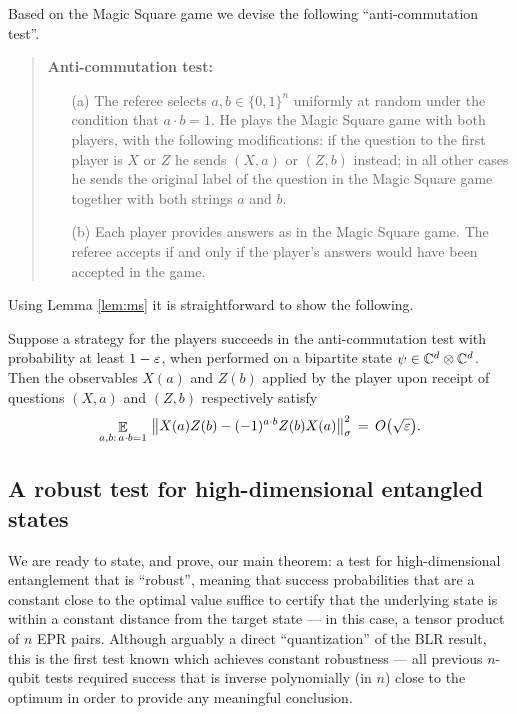 Based on the Magic Square game we devise the following ``anti-commutation test''. 

\begin{quote}
\textbf{Anti-commutation test:}
\begin{itemize}
\item[(a)] The referee selects $a,b\in\{0,1\}^n$ uniformly at random under the condition that $a\cdot b=1$. He plays the Magic Square game with both players, with the following modifications: if the question to the first player is $X$ or $Z$ he sends $(X,a)$ or $(Z,b)$ instead; in all other cases he sends the original label of the question in the Magic Square game together with both strings $a$ and $b$. 
\item[(b)] Each player provides answers as in the Magic Square game. The referee accepts if and only if the player's answers would have been accepted in the game. 
\end{itemize}
\end{quote}

Using Lemma \ref{lem:ms} it is straightforward to show the following. 

\begin{lemma}\label{lem:ac}
Suppose a strategy for the players succeeds in the anti-commutation test with probability at least $1-\varepsilon$, when performed on a bipartite state $\psi \in \mathbb{C}^d \otimes \mathbb{C}^d$. Then the observables $X(a)$ and $Z(b)$ applied by the player upon receipt of questions $(X,a)$ and $(Z,b)$ respectively satisfy 
\begin{equation}\label{eq:ac}
 \mathop{\mathbb{E}}\displaylimits_{a,b:\,a\cdot b=1} \,\big\| X(a)Z(b)-(-1)^{a\cdot b} Z(b)X(a)\big\|_\sigma^2\,=\,O\big(\sqrt{\varepsilon}\big).
\end{equation}
\end{lemma}

\subsection{A robust test for high-dimensional entangled states}
\label{subsection-robust-test-high-dim-entangled-states}

We are ready to state, and prove, our main theorem: a test for high-dimensional entanglement that is ``robust'', meaning that success probabilities that are a constant close to the optimal value suffice to certify that the underlying state is within a constant distance from the target state --- in this case, a tensor product of $n$ EPR pairs. Although arguably a direct ``quantization'' of the BLR result, this is the first test known which achieves constant robustness --- all previous $n$-qubit tests required success that is inverse polynomially (in $n$) close  to the optimum in order to provide any meaningful conclusion.

